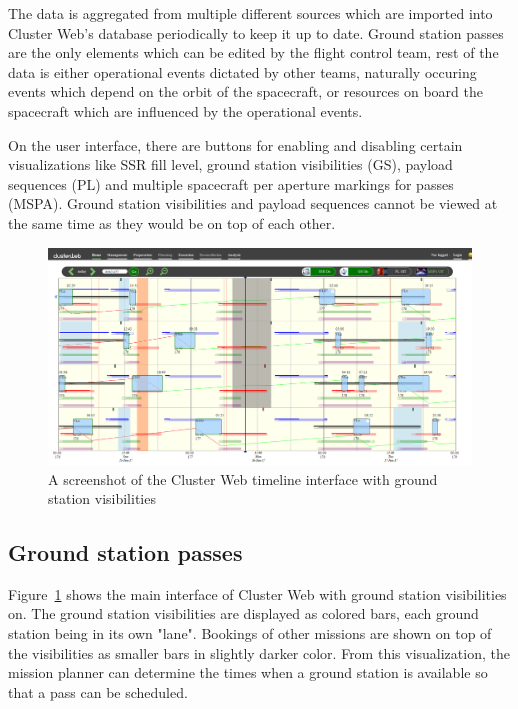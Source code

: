 The data is aggregated from multiple different sources which are imported into Cluster Web's database periodically to keep it up to date. Ground station passes are the only elements which can be edited by the flight control team, rest of the data is either operational events dictated by other teams, naturally occuring events which depend on the orbit of the spacecraft, or resources on board the spacecraft which are influenced by the operational events.

On the user interface, there are buttons for enabling and disabling certain visualizations like SSR fill level, ground station visibilities (GS), payload sequences (PL) and multiple spacecraft per aperture markings for passes (MSPA). Ground station visibilities and payload sequences cannot be viewed at the same time as they would be on top of each other.

\begin{figure}[ht]
  \begin{center}
    \includegraphics*[width=1\textwidth]{clusterweb_visibilities}
  \end{center}
  \caption{A screenshot of the Cluster Web timeline interface with ground station visibilities}
  \label{fig:clusterweb_visibilities}
\end{figure}

\subsection{Ground station passes}
Figure~\ref{fig:clusterweb_visibilities} shows the main interface of Cluster Web with ground station visibilities on. The ground station visibilities are displayed as colored bars, each ground station being in its own "lane". Bookings of other missions are shown on top of the visibilities as smaller bars in slightly darker color. From this visualization, the mission planner can determine the times when a ground station is available so that a pass can be scheduled. 

